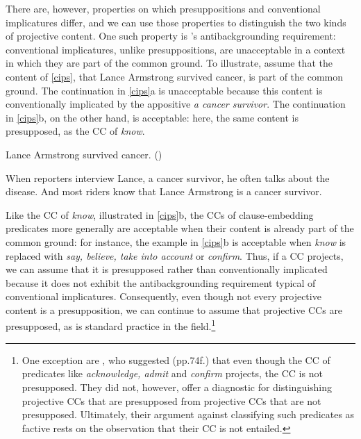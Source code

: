 \documentclass{language}
\def\infelic{{\leavevmode\llap{\#}}}
\newcommand{\6}{\mbox{$[\hspace*{-.6mm}[$}}
\newcommand{\9}{\mbox{$]\hspace*{-.6mm}]$}}
\newcommand{\citepos}[1]{\citeauthor{#1}'s \citeyear{#1}}
\begin{document}
There are, however, properties on which presuppositions and conventional implicatures differ, and we can use those properties to distinguish the two kinds of projective content. One such property is \citepos{potts05} antibackgrounding requirement: conventional implicatures, unlike presuppositions, are unacceptable in a context in which they are part of the common ground. To illustrate, assume that the content of \ref{cips}, that Lance Armstrong survived cancer, is part of the common ground. The continuation in \ref{cips}a is unacceptable because this content is conventionally implicated by the appositive {\em a cancer survivor}. The continuation in \ref{cips}b, on the other hand, is acceptable: here, the same content is presupposed, as the CC of {\em know}. 

\begin{exe}
\ex\label{cips} Lance Armstrong survived cancer. \hfill (\citealt[34]{potts05})
\begin{xlist}
\ex \infelic When reporters interview Lance, a cancer survivor, he often talks about the disease.
\ex And most riders know that Lance Armstrong is a cancer survivor.  
\end{xlist}
\end{exe}
Like the CC of {\em know}, illustrated in \ref{cips}b, the CCs of clause-embedding predicates more generally are acceptable when their content is already part of the common ground: for instance, the example in \ref{cips}b is acceptable when {\em know} is replaced with {\em say, believe, take into account} or {\em confirm}. Thus, if a CC projects, we can assume that it is presupposed rather than conventionally implicated because it does not exhibit the antibackgrounding requirement typical of conventional implicatures. Consequently, even though not every projective content is a presupposition, we can continue to assume that projective CCs are presupposed, as is standard practice in the field.\footnote{One exception are \citet{anand-hacquard2014}, who suggested (pp.74f.) that even though the CC of predicates like {\em acknowledge, admit} and {\em confirm} projects, the CC is not presupposed. They did not, however, offer a diagnostic for distinguishing projective CCs that are presupposed from projective CCs that are not presupposed. Ultimately, their argument against classifying such predicates as factive rests on the observation that their CC is not entailed.}  

\end{document}
